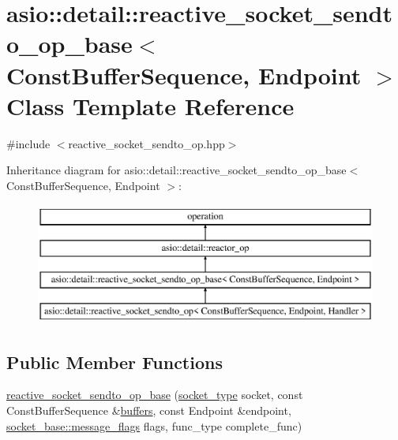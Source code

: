 \hypertarget{classasio_1_1detail_1_1reactive__socket__sendto__op__base}{}\section{asio\+:\+:detail\+:\+:reactive\+\_\+socket\+\_\+sendto\+\_\+op\+\_\+base$<$ Const\+Buffer\+Sequence, Endpoint $>$ Class Template Reference}
\label{classasio_1_1detail_1_1reactive__socket__sendto__op__base}


{\ttfamily \#include $<$reactive\+\_\+socket\+\_\+sendto\+\_\+op.\+hpp$>$}

Inheritance diagram for asio\+:\+:detail\+:\+:reactive\+\_\+socket\+\_\+sendto\+\_\+op\+\_\+base$<$ Const\+Buffer\+Sequence, Endpoint $>$\+:\begin{figure}[H]
\begin{center}
\leavevmode
\includegraphics[height=4.000000cm]{classasio_1_1detail_1_1reactive__socket__sendto__op__base}
\end{center}
\end{figure}
\subsection*{Public Member Functions}
\begin{DoxyCompactItemize}
\item 
\hyperlink{classasio_1_1detail_1_1reactive__socket__sendto__op__base_ae077d3ce1544e50a7036702e4b9896d1}{reactive\+\_\+socket\+\_\+sendto\+\_\+op\+\_\+base} (\hyperlink{namespaceasio_1_1detail_a6798c771dd84b79798b1a08150706ea9}{socket\+\_\+type} socket, const Const\+Buffer\+Sequence \&\hyperlink{group__async__read_ga54dede45c3175148a77fe6635222c47d}{buffers}, const Endpoint \&endpoint, \hyperlink{classasio_1_1socket__base_ac3cf77465dfedfe1979b5415cf32cc94}{socket\+\_\+base\+::message\+\_\+flags} flags, func\+\_\+type complete\+\_\+func)
\end{DoxyCompactItemize}
